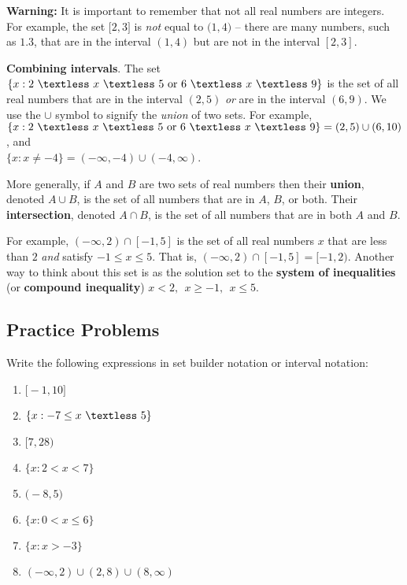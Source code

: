 \documentclass[11pt]{book}               %
\begin{document}
\textbf{Warning:} It is important to remember that not all real numbers are integers. For example, the set $ \big [ 2, 3 \big ]$ is \emph{not} equal to $ \big ( 1, 4 \big )$ -- there are many numbers, such as $1.3$, that are in the interval $(1,4)$ but are not in the interval $[2,3]$.

\textbf{Combining intervals}. %
The set $\{x : 2 \ \textless \ x \ \textless \ 5 \mbox{ or } 6 \ \textless \ x \ \textless \ 9\}$ is the set of all real numbers that are in the interval $(2,5)$ \emph{or} are in the interval $(6,9)$. We use the $\cup$  symbol to signify the \emph{union} of two sets. For example, 
$\{x : 2 \ \textless \ x \ \textless \ 5 \mbox{ or } 6 \ \textless \ x \ \textless \ 9\}=(2,5)\cup(6,10)$, and \\
$\{x : x\neq -4 \} = (-\infty,-4)\cup(-4,\infty)$.


More generally, if $A$ and $B$ are two sets of real numbers then their \textbf{union}, denoted $A \cup B$, is the set of all numbers that are in $A$, $B$, or both. Their \textbf{intersection}, denoted $A \cap B$, is the set of all numbers that are in both $A$ and $B$.

For example, $(-\infty, 2) \cap [-1, 5]$ is the set of all real numbers $x$ that are less than $2$ \emph{and} satisfy $-1\leq x \leq 5$. That is, $(-\infty, 2) \cap [-1,5]=[-1,2)$.
Another way to think about this set is as the solution set to the {\bf system of inequalities} 
(or {\bf compound inequality}) $x < 2,\ \ x \geq -1,\ \ x \leq 5$.

\subsection{Practice Problems}

Write the following expressions in set builder notation or interval notation: 
\begin{enumerate}
\item $ \big[ -1, 10 \big] $
\item $ \{ x : -7  \leq x \ \textless \  5 \}$
\item $ \big[ 7, 28 \big) $
\item$ \{ x : 2  < x < 7 \}$
\item $ \big( -8, 5 \big) $
\item $ \{ x : 0 < x \leq 6 \}$
\item $\{x : x > -3\}$%
\item $(-\infty,2)\cup(2,8)\cup(8,\infty)$%

\end{enumerate}
\end{document}
